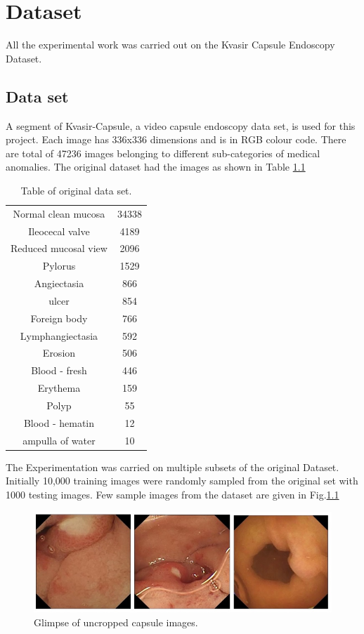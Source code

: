 \chapter{Dataset}
All the experimental work was carried out on the Kvasir Capsule Endoscopy Dataset\cite{data}. 
\section{Data set}
A segment of Kvasir-Capsule, a video capsule endoscopy data set, is used for this project.
Each image has 336x336 dimensions and is in RGB colour code. There are total of 47236 images belonging to different sub-categories of medical anomalies.
The original dataset had the images as shown in Table \ref{Table:4.1}
\begin{table}[h!]
\centering
\caption{Table of original data set.}
\begin{tabular}{ |c|c| }
\hline
 Normal clean mucosa & 34338 \\
 Ileocecal valve & 4189 \\
 Reduced mucosal view & 2096 \\
 Pylorus    &    1529 \\
 Angiectasia         &     866 \\
 ulcer               &     854 \\
 Foreign body        &     766\\    
 Lymphangiectasia    &     592 \\
 Erosion             &     506 \\
 Blood - fresh       &     446 \\
 Erythema            &      159 \\
 Polyp               &      55 \\
 Blood - hematin     &       12 \\
 ampulla of water    &        10 \\
\hline
\end{tabular}
\label{Table:4.1}
\end{table}
\newline
The Experimentation was carried on multiple subsets of the original Dataset.
Initially 10,000 training images were randomly sampled from the original set with 1000 testing images. Few sample images from the dataset are given in Fig.\ref{fig:label4.1}
\begin{figure}[h]
    \centering
    \includegraphics[totalheight=1.5in]{Chapter4/Fig4.1.jpg}
    \caption[Glimpse of uncropped capsule images]{Glimpse of uncropped capsule images.\cite{data}}
    \label{fig:label4.1}
\end{figure}
